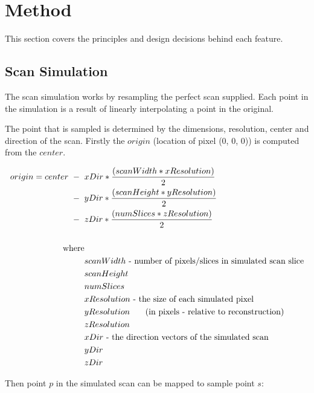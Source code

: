 \chapter{Method}
This section covers the principles and design decisions behind each feature.


\section{Scan Simulation}
The scan simulation works by resampling the perfect scan supplied. Each point in the simulation is a result of linearly interpolating a point in the original.

The point that is sampled is determined by the dimensions, resolution, center and direction of the scan. Firstly the $origin$ (location of pixel (0, 0, 0)) is computed from the $center$.

\begin{align*}
origin = center \text{ }-\text{ }& xDir * \frac{(scanWidth * xResolution)}{2} \nonumber \\
 	  			\text{ }-\text{ }& yDir * \frac{(scanHeight * yResolution)}{2} \nonumber \\
 	  			\text{ }-\text{ }& zDir * \frac{(numSlices * zResolution)}{2} \nonumber \\
 	  			\\
	\text{where}& \\
	& scanWidth \text{ - number of pixels/slices in simulated scan slice} \nonumber \\
	& scanHeight \nonumber \\
	& numSlices \nonumber \\
	& xResolution \text{ - the size of each simulated pixel} \nonumber \\
	& yResolution \text{\hspace*{1.5em} (in pixels - relative to reconstruction)} \nonumber \\
	& zResolution \nonumber \\
	& xDir \text{ - the direction vectors of the simulated scan} \nonumber \\
	& yDir \nonumber \\
	& zDir \nonumber
\end{align*}

Then point $p$ in the simulated scan can be mapped to sample point $s$:

